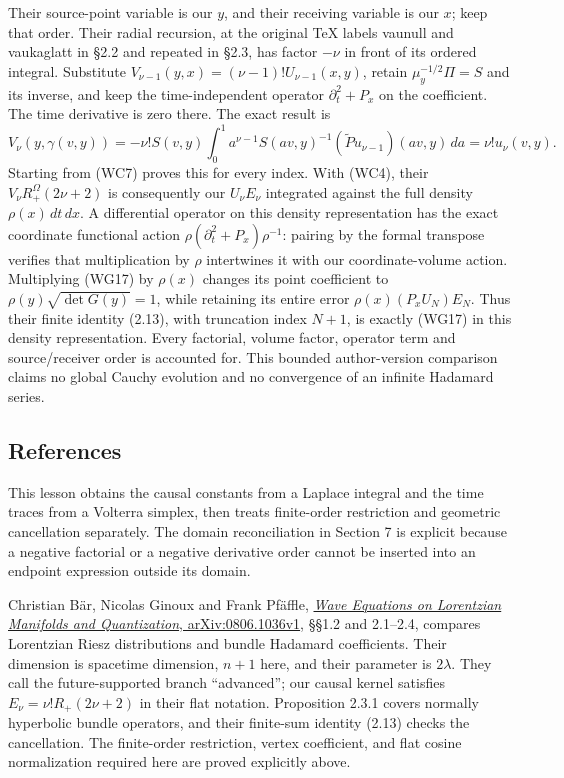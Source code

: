 \documentclass[
  11pt,
]{article}
\begin{document}
Their source-point variable is our \(y\), and their receiving variable
is our \(x\); keep that order. Their radial recursion, at the original
TeX labels vaunull and vaukaglatt in §2.2 and repeated in §2.3, has
factor \(-\nu\) in front of its ordered integral. Substitute
\(V_{\nu-1}(y,x)=(\nu-1)!U_{\nu-1}(x,y)\), retain \(\mu_y^{-1/2}\Pi=S\)
and its inverse, and keep the time-independent operator
\(\partial_t^2+P_x\) on the coefficient. The time derivative is zero
there. The exact result is \[
 V_\nu(y,\gamma(v,y))=
   -\nu!S(v,y)\int_0^1 a^{\nu-1}S(av,y)^{-1}
                         (\widetilde Pu_{\nu-1})(av,y)\,da
   =\nu!u_\nu(v,y).
 \tag{WC8}
\] Starting from (WC7) proves this for every index. With (WC4), their
\(V_\nu R_+^\Omega(2\nu+2)\) is consequently our \(U_\nu E_\nu\)
integrated against the full density \(\rho(x)\,dt\,dx\). A differential
operator on this density representation has the exact coordinate
functional action \(\rho(\partial_t^2+P_x)\rho^{-1}\): pairing by the
formal transpose verifies that multiplication by \(\rho\) intertwines it
with our coordinate-volume action. Multiplying (WG17) by \(\rho(x)\)
changes its point coefficient to \(\rho(y)\sqrt{\det G(y)}=1\), while
retaining its entire error \(\rho(x)(P_xU_N)E_N\). Thus their finite
identity (2.13), with truncation index \(N+1\), is exactly (WG17) in
this density representation. Every factorial, volume factor, operator
term and source/receiver order is accounted for. This bounded
author-version comparison claims no global Cauchy evolution and no
convergence of an infinite Hadamard series.

\subsection{References}\label{references}

This lesson obtains the causal constants from a Laplace integral and the
time traces from a Volterra simplex, then treats finite-order
restriction and geometric cancellation separately. The domain
reconciliation in Section 7 is explicit because a negative factorial or
a negative derivative order cannot be inserted into an endpoint
expression outside its domain.

Christian Bär, Nicolas Ginoux and Frank Pfäffle,
\href{https://arxiv.org/abs/0806.1036v1}{\emph{Wave Equations on
Lorentzian Manifolds and Quantization}, arXiv:0806.1036v1}, §§1.2 and
2.1--2.4, compares Lorentzian Riesz distributions and bundle Hadamard
coefficients. Their dimension is spacetime dimension, \(n+1\) here, and
their parameter is \(2\lambda\). They call the future-supported branch
``advanced''; our causal kernel satisfies \(E_\nu=\nu!R_+(2\nu+2)\) in
their flat notation. Proposition 2.3.1 covers normally hyperbolic bundle
operators, and their finite-sum identity (2.13) checks the cancellation.
The finite-order restriction, vertex coefficient, and flat cosine
normalization required here are proved explicitly above.
\end{document}

